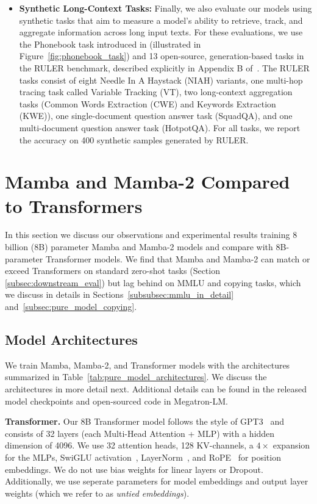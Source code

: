 \begin{itemize}
    \item \textbf{Synthetic Long-Context Tasks:} Finally, we also evaluate our models using synthetic tasks that aim to measure a model's ability to retrieve, track, and aggregate information across long input texts. For these evaluations, we use the Phonebook task introduced in \cite{jelassi2024repeatafterme} (illustrated in Figure~\ref{fig:phonebook_task}) and 13 open-source, generation-based tasks in the RULER benchmark, described explicitly in Appendix B of~\cite{hsieh2024ruler}. The RULER tasks consist of eight Needle In A Haystack (NIAH) variants, one multi-hop tracing task called Variable Tracking (VT), two long-context aggregation tasks (Common Words Extraction (CWE) and Keywords Extraction (KWE)), one single-document question answer task (SquadQA), and one multi-document question answer task (HotpotQA). For all tasks, we report the accuracy on 400 synthetic samples generated by RULER.
\end{itemize}

\section{Mamba and Mamba-2 Compared to Transformers} In this section we discuss our observations and experimental results training 8 billion (8B) parameter Mamba and Mamba-2 models and compare with 8B-parameter Transformer models. We find that Mamba and Mamba-2 can match or exceed Transformers on standard zero-shot tasks (Section \ref{subsec:downstream_eval}) but lag behind on MMLU and copying tasks, which we discuss in details in Sections~\ref{subsubsec:mmlu_in_detail} and~\ref{subsec:pure_model_copying}.

\subsection{Model Architectures}
\label{subsec:pure_model_arch}
We train Mamba, Mamba-2, and Transformer models with the architectures summarized in Table~\ref{tab:pure_model_architectures}. We discuss the architectures in more detail next. Additional details can be found in the released model checkpoints and open-sourced code in Megatron-LM.

\textbf{Transformer.}
Our 8B Transformer model follows the style of GPT3~\citep{brown2020language} and consists of 32 layers (each Multi-Head Attention + MLP) with a hidden dimension of 4096. We use 32 attention heads, 128 KV-channels, a $4\times$ expansion for the MLPs, SwiGLU activation~\citep{shazeer2020glu}, LayerNorm~\citep{ba2016layer}, and RoPE~\citep{su2024roformer} for position embeddings. We do not use bias weights for linear layers or Dropout. Additionally, we use seperate parameters for model embeddings and output layer weights (which we refer to as \textit{untied embeddings}).

